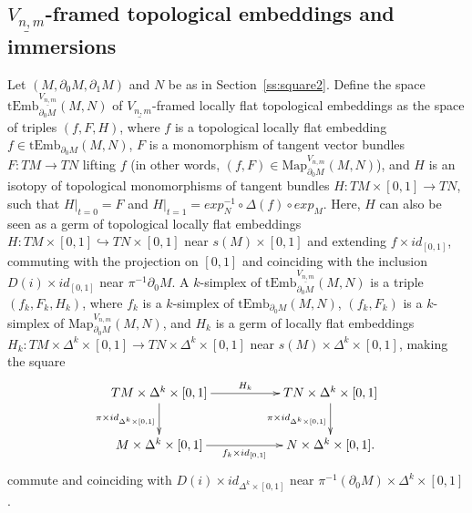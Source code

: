 \documentclass[11pt]{amsart}
\theoremstyle{definition}
\newcommand{\tEmb}{\mathrm{tEmb}}
\newcommand{\Map}{\mathrm{Map}}
\numberwithin{equation}{section}
\begin{document}
\subsection{$\underline{V_{n,m}}$-framed topological embeddings and immersions}\label{ss:Vnm}
Let $(M,\partial_0M,\partial_1M)$ and $N$ be as in Section~\ref{ss:square2}. 
Define the space $\tEmb_{\partial_0M}^{\underline{V_{n,m}}}(M,N)$ of $\underline{V_{n,m}}$-framed locally flat topological embeddings as the space of triples
$(f,F,H)$, where $f$ is a topological locally flat embedding $f\in \tEmb_{\partial_0M}(M,N)$, $F$ is a monomorphism of tangent vector bundles $F\colon TM\to TN$
lifting $f$ (in other words, $(f,F)\in \Map_{\partial_0M}^{V_{n,m}}(M,N)$), and $H$ is an isotopy of topological monomorphisms of tangent bundles $H\colon TM\times[0,1]\to TN$, such that $H|_{t=0}=F$ and $H|_{t=1}=exp^{-1}_N\circ\Delta(f)\circ exp_M$. Here, $H$ can also be seen as a germ of topological locally flat embeddings 
$H\colon TM\times [0,1]\hookrightarrow TN\times [0,1]$ near $s(M)\times [0,1]$ and extending $f\times id_{[0,1]}$, commuting with the projection on $[0,1]$ 
and coinciding with the inclusion $D(i)\times id_{[0,1]}$ near $\pi^{-1}\partial_0 M$.
A $k$-simplex of $\tEmb_{\partial_0M}^{\underline{V_{n,m}}}(M,N)$ is a triple $(f_k,F_k,H_k)$, where $f_k$ is a $k$-simplex of $\tEmb_{\partial_0M}(M,N)$,
$(f_k,F_k)$ is a $k$-simplex of $\Map_{\partial_0M}^{V_{n,m}}(M,N)$, and $H_k$ is a germ of locally flat embeddings $H_k\colon TM\times\Delta^k\times [0,1]
\to TN\times\Delta^k\times [0,1]$ near $s(M)\times\Delta^k\times[0,1]$, making the square
\[
\xymatrix{
 TM\times\Delta^k\times [0,1]\ar[rr]^-{H_k}\ar[d]_{\pi\times id_{\Delta^k\times[0,1]}} & & TN\times\Delta^k\times [0,1]\ar[d]_{\pi\times id_{\Delta^k\times[0,1]}}\\ %
M\times\Delta^k\times[0,1]\ar[rr]_-{f_k\times id_{[0,1]}}&&N\times\Delta^k\times[0,1].
}
\]
commute and coinciding with $D(i)\times id_{\Delta^k\times [0,1]}$ near $\pi^{-1}(\partial_0M)\times \Delta^k\times [0,1]$.
\end{document}
